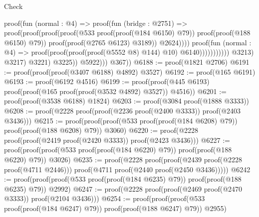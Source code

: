 \begin{lexlean}{Check}
\begin{coremodule}
                                                                proof(fun (normal : @4) =>
                                                                  proof(fun (bridge : @2751) =>
                                                                    proof(proof(proof(proof(@533
                                                                              proof(proof(@184
                                                                                    @6150)
                                                                                  @79))
                                                                            proof(proof(@188 @6150)
                                                                                @79))
                                                                          proof(proof(@2765 @6123)
                                                                              @3189))
                                                                        @2624))))
                                                              proof(fun (normal : @4) =>
                                                                proof(proof(proof(proof(@5552 @8)
                                                                        @144)
                                                                      @10)
                                                                    @6140)))))))))))
                              @3213)
                            @3217)
                          @3221)
                        @3225))
                  @5922)))
          @367))
@6188 := proof(@1821 @2706)
@6191 := proof(proof(proof(@3407 @6188) @4892) @3527)
@6192 := proof(@165 @6191)
@6193 := proof(@6192 @4516)
@6199 := proof(proof(@445 @6193) proof(proof(@165 proof(proof(@3532 @4892) @3527)) @4516))
@6201 := proof(proof(@3538 @6188) @1824)
@6203 := proof(@3084 proof(@1888 @3333))
@6208 := proof(@2228 proof(proof(@2236 proof(@2400 @3333)) proof(@2403 @3436)))
@6215 := proof(proof(proof(@533 proof(proof(@184 @6208) @79)) proof(proof(@188 @6208) @79)) @3060)
@6220 := proof(@2228 proof(proof(@2419 proof(@2420 @3333)) proof(@2423 @3436)))
@6227 := proof(proof(proof(@533 proof(proof(@184 @6220) @79)) proof(proof(@188 @6220) @79)) @3026)
@6235 := proof(@2228
      proof(proof(@2439 proof(@2228 proof(@4711 @2446)))
          proof(@4711 proof(@2440 proof(@2450 @3436)))))
@6242 := proof(proof(proof(@533 proof(proof(@184 @6235) @79)) proof(proof(@188 @6235) @79)) @2992)
@6247 := proof(@2228 proof(proof(@2469 proof(@2470 @3333)) proof(@2104 @3436)))
@6254 := proof(proof(proof(@533 proof(proof(@184 @6247) @79)) proof(proof(@188 @6247) @79)) @2955)

\end{coremodule}
\end{lexlean}
